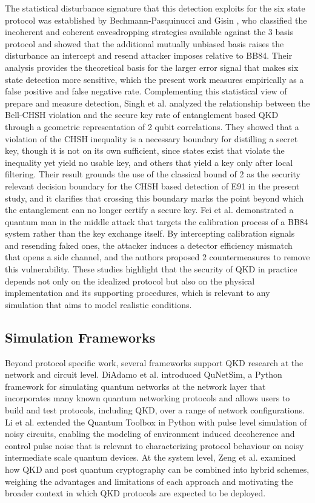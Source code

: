 \documentclass[conference]{IEEEtran}
\begin{document}
The statistical disturbance signature that this detection exploits for the six
state protocol was established by Bechmann-Pasquinucci and Gisin
\cite{bechmann1999incoherent}, who classified the incoherent and coherent
eavesdropping strategies available against the 3 basis protocol and showed
that the additional mutually unbiased basis raises the disturbance an
intercept and resend attacker imposes relative to BB84. Their analysis provides
the theoretical basis for the larger error signal that makes six state detection
more sensitive, which the present work measures empirically as a false positive
and false negative rate. Complementing this statistical view of prepare and
measure detection, Singh et al. \cite{singh2021role} analyzed the relationship
between the Bell-CHSH violation and the secure key rate of entanglement based QKD
through a geometric representation of 2 qubit correlations. They showed that a
violation of the CHSH inequality is a necessary boundary for distilling a secret
key, though it is not on its own sufficient, since states exist that violate the
inequality yet yield no usable key, and others that yield a key only after local
filtering. Their result grounds the use of the classical bound of 2 as the
security relevant decision boundary for the CHSH based detection of E91 in the
present study, and it clarifies that crossing this boundary marks the point
beyond which the entanglement can no longer certify a secure key.
Fei et al. \cite{fei2018quantum} demonstrated a quantum man in the middle attack
that targets the calibration process of a BB84 system rather than the key
exchange itself. By intercepting calibration signals and resending faked ones,
the attacker induces a detector efficiency mismatch that opens a side channel,
and the authors proposed 2 countermeasures to remove this vulnerability. These
studies highlight that the security of QKD in practice depends not only on the
idealized protocol but also on the physical implementation and its supporting
procedures, which is relevant to any simulation that aims to model realistic
conditions.

\subsection{Simulation Frameworks}
Beyond protocol specific work, several frameworks support QKD research at the
network and circuit level. DiAdamo et al. \cite{diadamo2021qunetsim} introduced
QuNetSim, a Python framework for simulating quantum networks at the network
layer that incorporates many known quantum networking protocols and allows
users to build and test protocols, including QKD, over a range of network
configurations. Li et al. \cite{li2022pulse} extended the Quantum Toolbox in
Python with pulse level simulation of noisy circuits, enabling the modeling of
environment induced decoherence and control pulse noise that is relevant to
characterizing protocol behaviour on noisy intermediate scale quantum devices.
At the system level, Zeng et al. \cite{zeng2024towards} examined how QKD and
post quantum cryptography can be combined into hybrid schemes, weighing the
advantages and limitations of each approach and motivating the broader context
in which QKD protocols are expected to be deployed.
\end{document}
